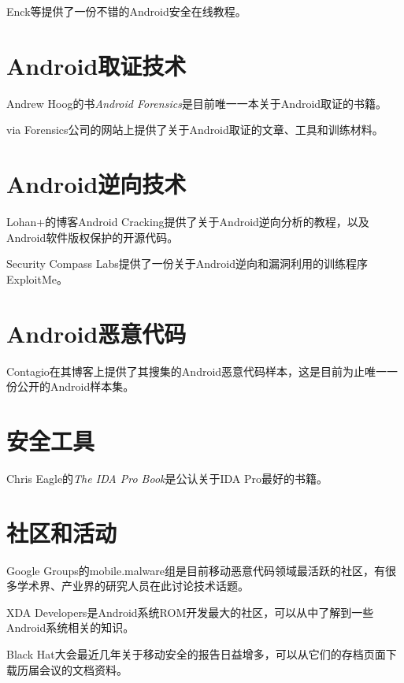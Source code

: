 Enck等提供了一份不错的Android安全在线教程\cite{url:psu_sectutor}。

\section*{Android取证技术}
Andrew Hoog的书{\it Android Forensics}\cite{android_forensics}是目前唯一一本关于Android取证的书籍。

via Forensics公司的网站\cite{url:viaforensics}上提供了关于Android取证的文章、工具和训练材料。

\section*{Android逆向技术}
Lohan+的博客Android Cracking\cite{url:androidcracking}提供了关于Android逆向分析的教程，以及Android软件版权保护的开源代码。

Security Compass Labs提供了一份关于Android逆向和漏洞利用的训练程序ExploitMe\cite{url:securitycompass}。

\section*{Android恶意代码}
Contagio在其博客\cite{url:contagio}上提供了其搜集的Android恶意代码样本，这是目前为止唯一一份公开的Android样本集。

\section*{安全工具}
Chris Eagle的{\it The IDA Pro Book}\cite{ida_pro}是公认关于IDA Pro最好的书籍。

\section*{社区和活动}
Google Groups的mobile.malware组\cite{url:group_mobilemalware}是目前移动恶意代码领域最活跃的社区，有很多学术界、产业界的研究人员在此讨论技术话题。

XDA Developers\cite{url:xda}是Android系统ROM开发最大的社区，可以从中了解到一些Android系统相关的知识。

Black Hat大会最近几年关于移动安全的报告日益增多，可以从它们的存档页面\cite{url:blackhat}下载历届会议的文档资料。

